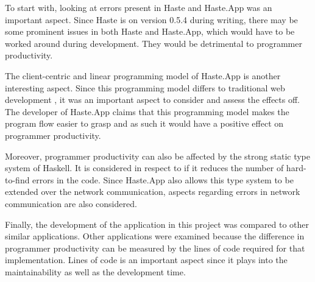 \documentclass[a4paper]{article}
\begin{document}
To start with, looking at errors present in Haste and Haste.App was an important aspect. Since Haste is on version 0.5.4 during writing, there may be some prominent issues in both Haste and Haste.App, which would have to be worked around during development. They would be detrimental to programmer productivity.

The client-centric and linear programming model of Haste.App is another interesting aspect. Since this programming model differs to traditional web development \cite{ekblad2015seamless}, it was an important aspect to consider and assess the effects off. The developer of Haste.App claims that this programming model makes the program flow easier to grasp \cite{ekblad2015seamless} and as such it would have a positive effect on programmer productivity.

Moreover, programmer productivity can also be affected by the strong static type system of Haskell. It is considered in respect to if it reduces the number of hard-to-find errors in the code. Since Haste.App also allows this type system to be extended over the network communication, aspects regarding errors in network communication are also considered. 

Finally, the development of the application in this project was compared to other similar applications. Other applications were examined because the difference in programmer productivity can be measured by the lines of code required for that implementation. Lines of code is an important aspect since it plays into the maintainability as well as the development time.  %

\end{document}
